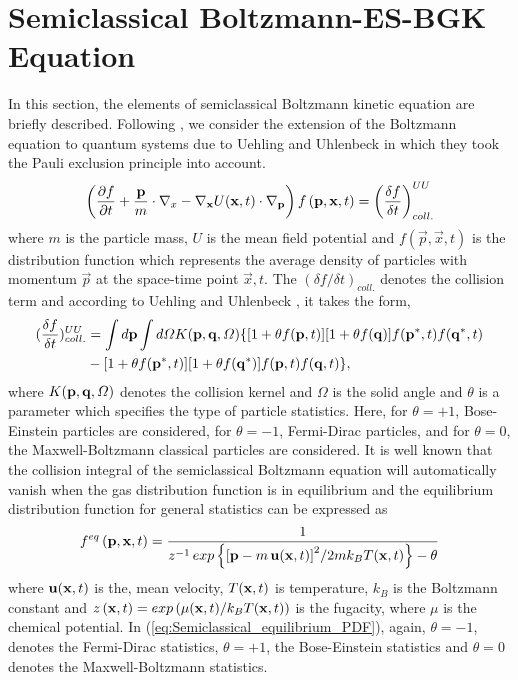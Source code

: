 \documentclass{rsproca}%
\begin{document}
\section{Semiclassical Boltzmann-ES-BGK Equation}
\label{sec:2}
In this section, the elements of semiclassical Boltzmann kinetic equation are briefly described.   Following \cite{PhysRev.43.552,KadanoffBaym}, we consider the extension of the Boltzmann equation to quantum systems due to Uehling and Uhlenbeck  in which they took the Pauli exclusion principle into account.
\begin{equation}
\left(\frac{\partial f}{\partial t}+\frac{\bf p}{m}\cdot {\bf\nabla }_x-{\bf \nabla}_{\bf x} U({\bf x},t)\cdot {\bf\nabla }_{\bf p}\right)f\left({\bf p},{\bf x},t\right)=\left(\frac{\delta f}{\delta t}\right)^{UU}_{coll.}
\end{equation}
where $m$ is the particle mass, $U$ is the mean field potential and $f(\vec p, \vec x, t)$ is the distribution function
which represents the average density of particles with momentum $\vec p$ at the space-time point $\vec x, t$. The $(\delta f
/\delta t)_{coll.}$ denotes the collision term and according to Uehling and Uhlenbeck \cite{PhysRev.43.552}, it takes the form,
\begin{align}
(\frac{\delta f} {\delta t})^{UU}_{coll.} &= \int d {\bf p} \int d\Omega
K({\bf p}, {\bf q}, \Omega) \{ [ 1+ \theta f({\bf p}, t)][1+ \theta f({\bf q})]f({\bf p}^*, t)f({\bf q}^*, t) \nonumber \\
&- [ 1+ \theta f({\bf p}^*, t)][1+ \theta f({\bf q}^*)]f({\bf p}, t)f({\bf q}, t) \},
\end{align}
where $K({\bf p}, {\bf q}, \Omega)$ denotes the collision kernel and $\Omega$ is the solid angle and $\theta$ is a parameter which specifies the type of particle statistics.   Here, for $\theta=+1$, Bose-Einstein particles are considered, for $\theta=-1$, Fermi-Dirac particles, and for $\theta=0$, the Maxwell-Boltzmann classical particles are considered.  It is well known that the collision integral of the semiclassical Boltzmann equation will automatically vanish when the gas distribution function is in equilibrium and the equilibrium distribution function for general statistics can be expressed as
\begin{equation}
f^{eq}\left({\bf p},{\bf x},t\right) =\frac{1}{z^{-1}\,exp\left\{{\left[{\bf p}-m\,{\bf u}({\bf x},t) \right]}^2/2mk_BT({\bf x},t)\right\} -\theta }
\label{eq:Semiclassical_equilibrium_PDF}
\end{equation}
where $ {\bf u}({\bf x},t)$ is the, mean velocity, $T({\bf x},t)$ is temperature, $k_B$ is the Boltzmann constant and $z\left({\bf x},t\right)= exp\left({\mu ({\bf x},t)/k_BT({\bf x},t)}\right)$ is the fugacity, where $\mu$ is the chemical potential.  In (\ref{eq:Semiclassical_equilibrium_PDF}), again, \(\theta=-1\), denotes the Fermi-Dirac statistics, \(\theta=+1\), the Bose-Einstein statistics and \(\theta=0\) denotes the Maxwell-Boltzmann statistics.
\end{document}
